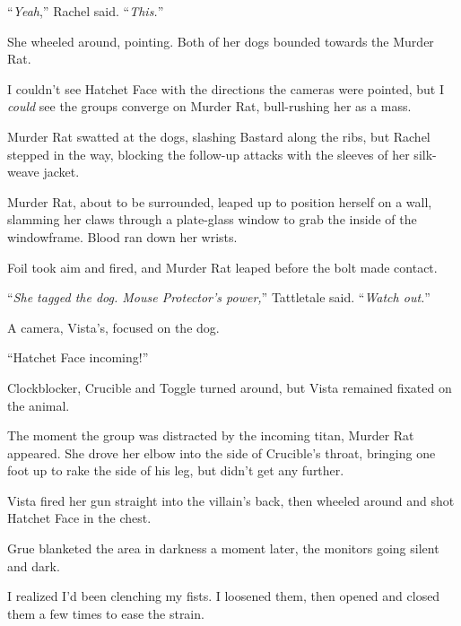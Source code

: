 ``\emph{Yeah},'' Rachel said.  ``\emph{This.}''



She wheeled around, pointing.  Both of her dogs bounded towards the Murder Rat.



I couldn't see Hatchet Face with the directions the cameras were pointed, but I \emph{could} see the groups converge on Murder Rat, bull-rushing her as a mass.



Murder Rat swatted at the dogs, slashing Bastard along the ribs, but Rachel stepped in the way, blocking the follow-up attacks with the sleeves of her silk-weave jacket.



Murder Rat, about to be surrounded, leaped up to position herself on a wall, slamming her claws through a plate-glass window to grab the inside of the windowframe.  Blood ran down her wrists.



Foil took aim and fired, and Murder Rat leaped before the bolt made contact.



``\emph{She tagged the dog.  Mouse Protector's power,}'' Tattletale said.  ``\emph{Watch out.}''



A camera, Vista's, focused on the dog.



``Hatchet Face incoming!''



Clockblocker, Crucible and Toggle turned around, but Vista remained fixated on the animal.



The moment the group was distracted by the incoming titan, Murder Rat appeared.  She drove her elbow into the side of Crucible's throat, bringing one foot up to rake the side of his leg, but didn't get any further.



Vista fired her gun straight into the villain's back, then wheeled around and shot Hatchet Face in the chest.



Grue blanketed the area in darkness a moment later, the monitors going silent and dark.



I realized I'd been clenching my fists.  I loosened them, then opened and closed them a few times to ease the strain.



